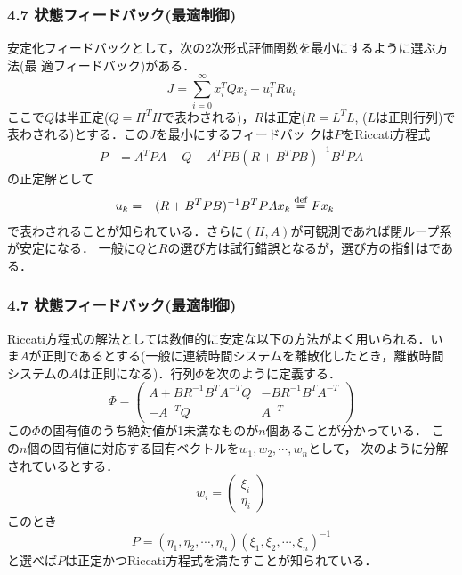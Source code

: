 \begin{frame}[t]
\frametitle{4.7 状態フィードバック(最適制御)}
安定化フィードバックとして，次の2次形式評価関数を最小にするように選ぶ方法(最
適フィードバック)がある．
\begin{equation}
 J = \sum_{i=0}^{\infty} x_i^T Q x_i + u_i^T R u_i 
\end{equation}
ここで$Q$は半正定($Q = H^T H$で表わされる)，$R$は正定($R = L^T L$,
($L$は正則行列)で表わされる)とする．この$J$を最小にするフィードバッ
クは$P$をRiccati方程式
\begin{align}
 P   &= A^T P A + Q - A^T P B (R + B^T P B)^{-1} B^T P A
\end{align}
の正定解として
\begin{align}
 u_k &= - (R + B^T P B)^{-1} B^T P A x_k \stackrel{\rm def}{=} Fx_k
\end{align}
で表わされることが知られている．さらに$(H, A)$が可観測であれば閉ループ系
が安定になる．
一般に$Q$と$R$の選び方は試行錯誤となるが，選び方の指針はである．
\end{frame}

\begin{frame}[t]
\frametitle{4.7 状態フィードバック(最適制御)}
Riccati方程式の解法としては数値的に安定な以下の方法がよく用いられる．い
ま$A$が正則であるとする(一般に連続時間システムを離散化したとき，離散時間
システムの$A$は正則になる)．行列$\Phi$を次のように定義する．
\begin{equation}
 \Phi =
  \left(\begin{array}{cc}
         A + B R^{-1} B^T A^{-T} Q & - B R^{-1} B^T A^{-T}\\
	 - A^{-T} Q                &  A^{-T}
	\end{array}\right)
\end{equation}
この$\Phi$の固有値のうち絶対値が1未満なものが$n$個あることが分かっている．
この$n$個の固有値に対応する固有ベクトルを$w_1, w_2, \cdots, w_n$として，
次のように分解されているとする．
\begin{equation}
 w_i = \left(\begin{array}{c}
	      \xi_i \\
	      \eta_i
	     \end{array}\right)
\end{equation}
このとき
\begin{equation}
 P = (\eta_1, \eta_2,\cdots,\eta_n)(\xi_1,\xi_2,\cdots,\xi_n)^{-1}
\end{equation}
と選べば$P$は正定かつRiccati方程式を満たすことが知られている．
\end{frame}

